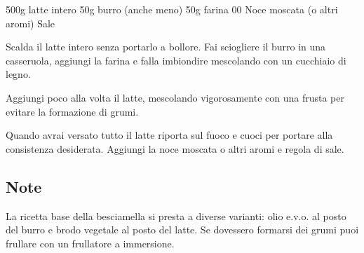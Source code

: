 \label{besciamella}
\serves{-}%
\begin{ingreds}
	500g latte intero
	50g burro (anche meno)
	50g farina 00
	Noce moscata (o altri aromi)
	Sale


\end{ingreds}

\begin{method}
Scalda il latte intero senza portarlo a bollore. Fai sciogliere il burro in una casseruola, aggiungi la farina e falla imbiondire mescolando con un cucchiaio di legno.

Aggiungi poco alla volta il latte, mescolando vigorosamente con una frusta per evitare la formazione di grumi.

Quando avrai versato tutto il latte riporta sul fuoco e cuoci per portare alla consistenza desiderata. Aggiungi la noce moscata o altri aromi e regola di sale.

\end{method}

\subsection*{Note}
La ricetta base della besciamella si presta a diverse varianti: olio e.v.o. al posto del burro e brodo vegetale al posto del latte. Se dovessero formarsi dei grumi puoi frullare con un frullatore a immersione.



